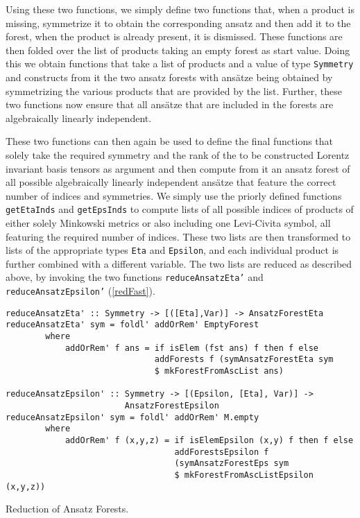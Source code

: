 Using these two functions, we simply define two functions that, when a product is missing, symmetrize it to obtain the corresponding ansatz and then add it to the forest, when the product is already present, it is dismissed. These functions are then folded over the list of products taking an empty forest as start value.  Doing this we obtain functions that take a list of products and a value of type \texttt{Symmetry} and constructs from it the two ansatz forests with ansätze being obtained by symmetrizing the various products that are provided by the list. Further, these two functions now ensure that all ansätze that are included in the forests are algebraically linearly independent. 

These two functions can then again be used to define the final functions that solely take the required symmetry and the rank of the to be constructed Lorentz invariant basis tensors as argument and then compute from it an ansatz forest of all possible algebraically linearly independent ansätze that feature the correct number of indices and symmetries. We simply use the priorly defined functions \texttt{getEtaInds} and \texttt{getEpsInds} to compute lists of all possible indices of products of either solely Minkowski metrics or also including one Levi-Civita symbol, all featuring the required number of indices. These two lists are then transformed to lists of the appropriate types \texttt{Eta} and \texttt{Epsilon}, and each individual product is further combined with a different variable. The two lists are reduced as described above, by invoking the two functions \texttt{reduceAnsatzEta'} and \texttt{reduceAnsatzEpsilon'} (\ref{redFast}).
\begin{listing}[hbt!]
\begin{verbatim}
reduceAnsatzEta' :: Symmetry -> [([Eta],Var)] -> AnsatzForestEta
reduceAnsatzEta' sym = foldl' addOrRem' EmptyForest
        where
            addOrRem' f ans = if isElem (fst ans) f then f else
                              addForests f (symAnsatzForestEta sym 
                              $ mkForestFromAscList ans)

reduceAnsatzEpsilon' :: Symmetry -> [(Epsilon, [Eta], Var)] ->
                        AnsatzForestEpsilon
reduceAnsatzEpsilon' sym = foldl' addOrRem' M.empty
        where
            addOrRem' f (x,y,z) = if isElemEpsilon (x,y) f then f else
                                  addForestsEpsilon f 
                                  (symAnsatzForestEps sym 
                                  $ mkForestFromAscListEpsilon (x,y,z))  
\end{verbatim} 
\caption{Reduction of Ansatz Forests.}\label{redFast}
\end{listing}
